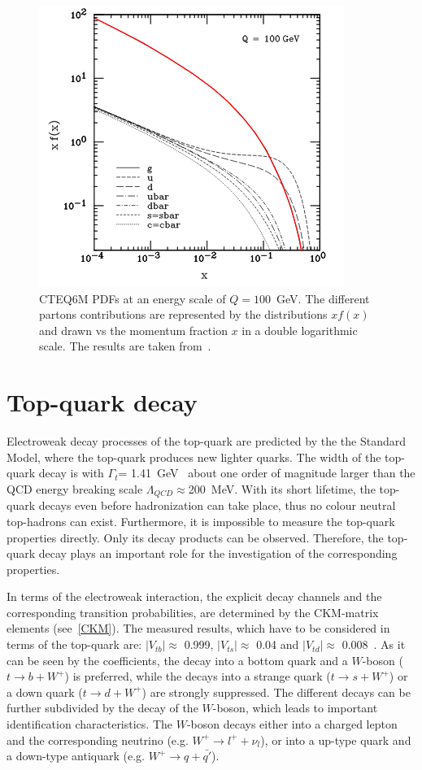  




\begin{figure}[h]
	\centering
	\includegraphics[width=0.55\linewidth]{Pics/cp1/PDF.png}
	\caption{ CTEQ6M PDFs  at an energy scale of $Q=100$~GeV. The different partons contributions are represented by the distributions $xf(x)$ and drawn vs the momentum fraction $x$ in a double logarithmic scale. The results are taken from~\cite{Pumplin:2002vw}.} 
	\label{fig:PDF}
\end{figure}


\section{Top-quark decay}\label{decay1}
Electroweak decay processes of the top-quark are predicted by the the Standard Model, where the top-quark produces new lighter quarks.  
The width of the top-quark decay is with $\Gamma_t$= 1.41~GeV~\cite{Olive:2016xmw} about one order of magnitude larger than the QCD energy breaking scale $\Lambda_{QCD}\approx$200~MeV. With its short lifetime, the top-quark decays even before  
hadronization can take place, thus no colour neutral top-hadrons can exist. Furthermore,  it is impossible to measure the top-quark properties directly. Only its decay products can be observed. Therefore, the top-quark decay plays an  important role for the investigation of the corresponding properties.


 In terms of the electroweak interaction, the explicit decay channels and the corresponding transition probabilities, are determined by the CKM-matrix elements (see~\cref{CKM}). The measured results, which have to be considered in terms of the top-quark are: $|V_{tb}| \approx$ 0.999,  $|V_{ts}|\approx$ 0.04 and  $|V_{td}|\approx$ 0.008~\cite{Olive:2016xmw}. 
As it can be seen by the coefficients, the decay into a bottom quark and a $W$-boson ($t \rightarrow b + W^+ $) is preferred, while the decays into a strange quark ($t \rightarrow s + W^+ $) or  a down quark ($t \rightarrow d + W^+ $) are strongly suppressed. The different decays can be further subdivided by the decay of the $W$-boson, which leads to important identification characteristics. The $W$-boson decays either into a charged lepton and the corresponding neutrino (e.g. $W^+\rightarrow l^+ + \nu_l$), or into a up-type quark and a down-type antiquark  (e.g. $W^+\rightarrow q + \bar{q'}$). 

